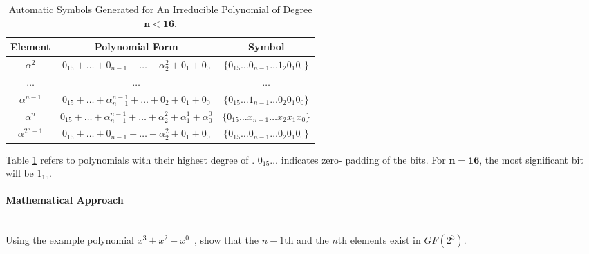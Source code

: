 \documentclass[11pt]{extarticle}
\newcommand{\examplepoly}{$x^{3}+x^{2}+x^{0}$}
\begin{document}
           \begin{table}[h]
                \def\arraystretch{2.5}
                \caption{Automatic Symbols Generated for An Irreducible
                Polynomial of Degree $\bm{n < 16}$.}
                \centering
                \begin{tabular*}{400pt}{@{\extracolsep{\fill}} ccc}

                \textbf{Element} & \textbf{Polynomial Form} & \textbf{Symbol}
                \\
                \hline

                $\alpha^{2}$ & $0_{15} + \ldots + 0_{n-1} + \ldots +
                \alpha^{2}_{2} + 0_{1} + 0_{0}$ & $\{ 0_{15} \ldots 0_{n-1}
                \ldots 1_{2} 0_{1} 0_{0} \}$ \\

                $\ldots$ & $\ldots$ & $\ldots$ \\

                $\alpha^{n-1}$ & $0_{15} + \ldots + \alpha^{n-1}_{n-1} + \ldots
                + 0_{2} + 0_{1} + 0_{0}$ & $\{ 0_{15} \ldots 1_{n-1} \ldots
                  0_{2} 0_{1} 0_{0} \}$ \\

                $\alpha^{n}$ & $0_{15} + \ldots + \alpha^{n-1}_{n-1} + \ldots
                +\alpha^{2}_{2} + \alpha^{1}_{1} + \alpha^{0}_{0}$ & $\{ 0_{15}
                \ldots x_{n-1} \ldots x_{2} x_{1} x_{0} \}$ \\

                $\alpha^{2^{n}-1}$ & $0_{15} + \ldots + 0_{n-1} + \ldots +
                \alpha^{2}_{2} + 0_{1} + 0_{0}$ & $\{ 0_{15} \ldots 0_{n-1}
                \ldots 0_{2} 0_{1} 0_{0} \}$ \\

                \end{tabular*}
                \label{table:auto_sym}
            \end{table}

            Table \ref{table:auto_sym} refers to polynomials with their
            highest degree of . $0_{15}\ldots$ indicates zero-
            padding of the bits. For $\bm{n = 16}$, the most significant bit
            will be $1_{15}$.

                \paragraph{Mathematical Approach} \leavevmode \\ Using the
                example polynomial \examplepoly~, show that the $n-1$th and the
                $n$th elements exist in $GF(2^{3})$.
\end{document}
